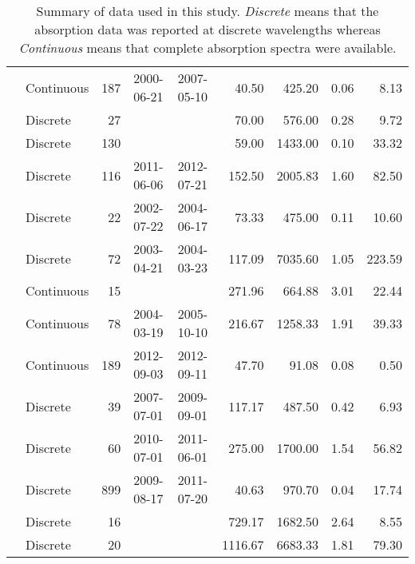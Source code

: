 \begin{table}[ht]
\begin{tabular}{llrllrrrr}
  \citet{Osburn2007} & Continuous & 187 & 2000-06-21 & 2007-05-10 & 40.50 & 425.20 & 0.06 & 8.13 \\ 
  \citet{Osburn2009} & Discrete &  27 &  &  & 70.00 & 576.00 & 0.28 & 9.72 \\ 
  \citet{Osburn2016} & Discrete & 130 &  &  & 59.00 & 1433.00 & 0.10 & 33.32 \\ 
  \citet{Polaris2012} & Discrete & 116 & 2011-06-06 & 2012-07-21 & 152.50 & 2005.83 & 1.60 & 82.50 \\ 
  \citet{Retamal2007} & Discrete &  22 & 2002-07-22 & 2004-06-17 & 73.33 & 475.00 & 0.11 & 10.60 \\ 
  \citet{Sickman2010} & Discrete &  72 & 2003-04-21 & 2004-03-23 & 117.09 & 7035.60 & 1.05 & 223.59 \\ 
  \citet{Stedmon2007a} & Continuous &  15 &  &  & 271.96 & 664.88 & 3.01 & 22.44 \\ 
  \citet{Stedmon2011} & Continuous &  78 & 2004-03-19 & 2005-10-10 & 216.67 & 1258.33 & 1.91 & 39.33 \\ 
  \citet{Stedmon2015} & Continuous & 189 & 2012-09-03 & 2012-09-11 & 47.70 & 91.08 & 0.08 & 0.50 \\ 
  \citet{Tehrani2013} & Discrete &  39 & 2007-07-01 & 2009-09-01 & 117.17 & 487.50 & 0.42 & 6.93 \\ 
  \citet{Wagner2015} & Discrete &  60 & 2010-07-01 & 2011-06-01 & 275.00 & 1700.00 & 1.54 & 56.82 \\ 
  \citet{Werdell2003} & Discrete & 899 & 2009-08-17 & 2011-07-20 & 40.63 & 970.70 & 0.04 & 17.74 \\ 
  \citet{Zhang2005} & Discrete &  16 &  &  & 729.17 & 1682.50 & 2.64 & 8.55 \\ 
   & Discrete &  20 &  &  & 1116.67 & 6683.33 & 1.81 & 79.30 \\ 
   \hline
\end{tabular}
\endgroup
\caption{Summary of data used in this study. \textit{Discrete} means that the 
absorption data was reported at discrete wavelengths whereas 
\textit{Continuous} means that complete absorption spectra were available.} 
\end{table}
